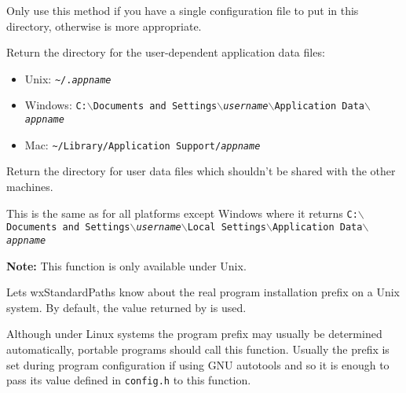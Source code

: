 Only use this method if you have a single configuration file to put in this
directory, otherwise  is
more appropriate.


\label{wxstandardpathsgetuserdatadir}


Return the directory for the user-dependent application data files:
\begin{itemize}
    \item Unix: \texttt{\verb|~|/.\textit{appname}}
    \item Windows: \texttt{C:$\backslash$Documents and Settings$\backslash$\textit{username}$\backslash$Application Data$\backslash$\textit{appname}}
    \item Mac: \texttt{\verb|~|/Library/Application Support/\textit{appname}}
\end{itemize}


\label{wxstandardpathsgetuserlocaldatadir}


Return the directory for user data files which shouldn't be shared with
the other machines.

This is the same as  for
all platforms except Windows where it returns 
\texttt{C:$\backslash$Documents and Settings$\backslash$\textit{username}$\backslash$Local Settings$\backslash$Application Data$\backslash$\textit{appname}}


\label{wxstandardpathssetinstallprefix}


\textbf{Note: } This function is only available under Unix.

Lets wxStandardPaths know about the real program installation prefix on a Unix
system. By default, the value returned by 
 is used.

Although under Linux systems the program prefix may usually be determined
automatically, portable programs should call this function. Usually the prefix
is set during program configuration if using GNU autotools and so it is enough
to pass its value defined in \texttt{config.h} to this function.


